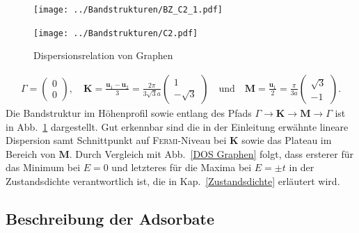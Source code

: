 \documentclass[a4paper, 10pt, twoside, openany]{book} %
\def \vec {\boldsymbol}
\newcommand \mat[1]{\begin{pmatrix} #1 \end{pmatrix}}
\begin{document}
	\begin{figure}
		\begin{minipage}[t]{0.48\textwidth}
			\texttt{[image: ../Bandstrukturen/BZ\_C2\_1.pdf]}
		\end{minipage}
		\hfill
		\begin{minipage}[t]{0.48\textwidth}
			\texttt{[image: ../Bandstrukturen/C2.pdf]}
		\end{minipage}
		\caption{Dispersionsrelation von Graphen}
		\label{C2}
	\end{figure}
	\begin{align*}
		\vec \varGamma = \mat{0 \\ 0}, \quad \vec K = \frac {\vec u_1 - \vec u_2} 3 = \frac{2 \pi}{3 \sqrt 3 a} \mat{1 \\ -\sqrt 3} \quad \text{und} \quad \vec M = \frac {\vec u_1} 2 = \frac \pi {3 a} \mat{\sqrt 3 \\ -1}.
	\end{align*}
	Die Bandstruktur im Höhenprofil sowie entlang des Pfads $\vec \varGamma \rightarrow \vec K \rightarrow \vec M \rightarrow \vec \varGamma$ ist in Abb.~\ref{C2} dargestellt. Gut erkennbar sind die in der Einleitung erwähnte lineare Dispersion samt Schnittpunkt auf \textsc{Fermi}-Niveau bei $\vec K$ sowie das Plateau im Bereich von $\vec M$. Durch Vergleich mit Abb.~\ref{DOS Graphen} folgt, dass ersterer für das Minimum bei $E = 0$ und letzteres für die Maxima bei $E = \pm t$ in der Zustandsdichte verantwortlich ist, die in Kap.~\ref{Zustandsdichte} erläutert wird.
	
	\subsection{Beschreibung der Adsorbate}
	
\end{document}
